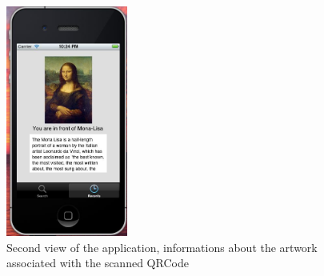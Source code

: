 \documentclass[a4paper, 12pt, final]{article}
\begin{document}
\begin{figure}[!h] %
\centering
\includegraphics[width=4cm]{2.jpg} %
\caption{Second view of the application, informations about the artwork associated with the scanned QRCode} %
\label{api} %
\end{figure} %
 
 
\end{document}
